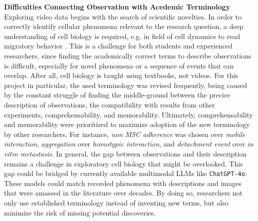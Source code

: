 \textbf{Difficulties Connecting Observation with Acedemic Terminology} Exploring video data
begins with the search of scientific novelties. In order to correctly identify
cellular phenomena relevant to the research question, a deep
understanding of cell biology is required, e.g. in field of cell dynamics to
read migratory behavior \cite{nalbantExploratoryCellDynamics2018}. This is a
challenge for both students and experienced researchers, since finding the
academically correct terms to describe observations is difficult, especially for
novel phenomena or a sequence of events that can overlap. After all, cell
biology is taught using textbooks, not videos. For this project in particular,
the used terminology was revised frequently, being caused by the constant
struggle of finding the middle-ground between the precice description of
observations, the compatibility with results from other experiments,
comprehensability, and memorability. Ultimately, comprehensability and
memorability were prioritized to maximize adoption of the new terminology by
other researchers. For instance, \emph{non MSC adherence} was chosen over
\emph{mobile interaction}, \emph{aggregation} over \emph{homotypic interaction},
and \emph{detachment event} over \emph{in vitro metastasis}. In general, the gap
between observations and their description remains a challenge in exploratory
cell biology that might be overlooked. This gap could be bridged by currently
available multimodal \acp{LLM} like \texttt{ChatGPT-4o}: These models could
match recorded phenomena with descriptions and images that were amassed in the
literature over decades. By doing so, researchers not only use established
terminology instead of inventing new terms, but also minimize the risk of
missing potential discoveries.

